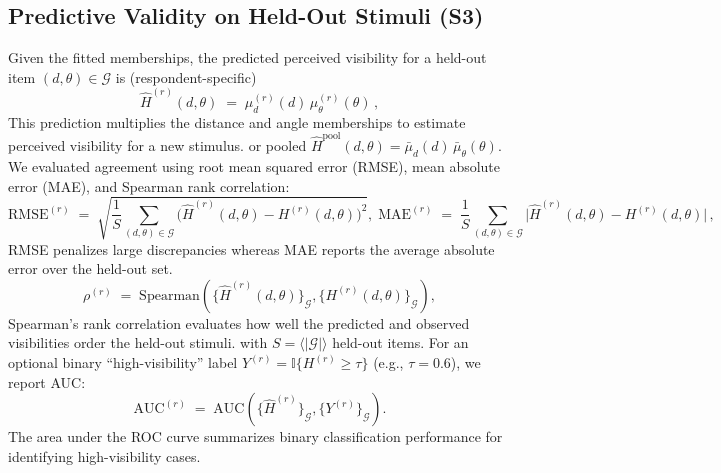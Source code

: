 \documentclass[final,3p,times,review]{elsarticle}
\begin{document}
\subsection{Predictive Validity on Held-Out Stimuli (S3)}
Given the fitted memberships, the predicted perceived visibility for a held-out item $(d,\theta)\in\mathcal{G}$ is (respondent-specific)
\begin{equation}
\widehat{H}^{(r)}(d,\theta) \;=\; \mu^{(r)}_d(d)\,\mu^{(r)}_\theta(\theta)\,,
\label{eq:hhat}
\end{equation}
This prediction multiplies the distance and angle memberships to estimate perceived visibility for a new stimulus.
or pooled $\widehat{H}^{\mathrm{pool}}(d,\theta)=\bar{\mu}_d(d)\,\bar{\mu}_\theta(\theta)$. We evaluated agreement using root mean squared error (RMSE), mean absolute error (MAE), and Spearman rank correlation:
\begin{equation}
\mathrm{RMSE}^{(r)} \;=\; \sqrt{\frac{1}{S}\sum_{(d,\theta)\in \mathcal{G}}
\big(\widehat{H}^{(r)}(d,\theta)-H^{(r)}(d,\theta)\big)^2}, \;
\mathrm{MAE}^{(r)} \;=\; \frac{1}{S}\sum_{(d,\theta)\in \mathcal{G}}
\big|\widehat{H}^{(r)}(d,\theta)-H^{(r)}(d,\theta)\big|\,,
\label{eq:rmse-mae}
\end{equation}
RMSE penalizes large discrepancies whereas MAE reports the average absolute error over the held-out set.
\begin{equation}
\rho^{(r)} \;=\; \mathrm{Spearman}\!\left(
\{\widehat{H}^{(r)}(d,\theta)\}_{\mathcal{G}},
\{H^{(r)}(d,\theta)\}_{\mathcal{G}}
\right),
\label{eq:spearman}
\end{equation}
Spearman's rank correlation evaluates how well the predicted and observed visibilities order the held-out stimuli.
with $S{=}\langle |\mathcal{G}|\rangle$ held-out items. For an optional binary “high-visibility” label $Y^{(r)}=\mathbb{I}\{H^{(r)}\ge\tau\}$ (e.g., $\tau{=}0.6$), we report AUC:
\begin{equation}
\mathrm{AUC}^{(r)} \;=\; \mathrm{AUC}\!\left(\{\widehat{H}^{(r)}\}_{\mathcal{G}}, \{Y^{(r)}\}_{\mathcal{G}}\right).
\label{eq:auc}
\end{equation}
The area under the ROC curve summarizes binary classification performance for identifying high-visibility cases.
\end{document}
